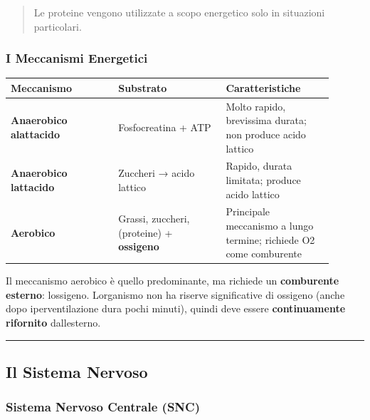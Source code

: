 \documentclass[a4paper,11pt]{article}
\begin{document}
\begin{quote}
      Le proteine vengono utilizzate a scopo energetico solo in situazioni
      particolari.
\end{quote}

\subsubsection{I Meccanismi Energetici}\label{i-meccanismi-energetici}

\begin{longtable}[]{@{}p{0.30\linewidth}p{0.30\linewidth}p{0.30\linewidth}@{}}
      \toprule\noalign{}
      Meccanismo                     & Substrato                                        & Caratteristiche \\
      \midrule\noalign{}
      \endhead
      \bottomrule\noalign{}
      \endlastfoot
      \textbf{Anaerobico alattacido} & Fosfocreatina + ATP                              & Molto rapido,
      brevissima durata; non produce acido lattico                                                        \\
      \textbf{Anaerobico lattacido}  & Zuccheri → acido lattico                         & Rapido,
      durata limitata; produce acido lattico                                                              \\
      \textbf{Aerobico}              & Grassi, zuccheri, (proteine) + \textbf{ossigeno} &
      Principale meccanismo a lungo termine; richiede O2 come comburente                                  \\
\end{longtable}

Il meccanismo aerobico è quello predominante, ma richiede un
\textbf{comburente esterno}: l\textquotesingle ossigeno.
L\textquotesingle organismo non ha riserve significative di ossigeno
(anche dopo iperventilazione dura pochi minuti), quindi deve essere
\textbf{continuamente rifornito} dall\textquotesingle esterno.

\begin{center}\rule{0.5\linewidth}{0.5pt}\end{center}

\subsection{Il Sistema Nervoso}\label{il-sistema-nervoso}

\subsubsection{Sistema Nervoso Centrale
      (SNC)}\label{sistema-nervoso-centrale-snc}
\end{document}
